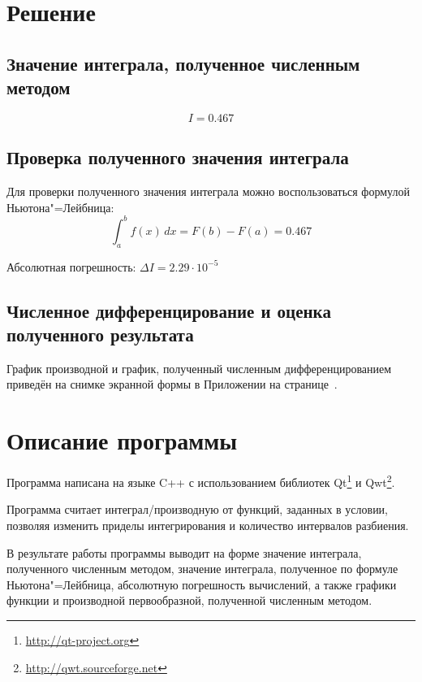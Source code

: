 \documentclass[a4paper,12pt,notitlepage,headsepline,pdftex]{scrartcl}
\begin{document}
\section{Решение}
  \subsection{Значение интеграла, полученное численным методом}
    \begin{equation}
      I = 0.467
      \label{eq:I}
    \end{equation}
  \subsection{Проверка полученного значения интеграла}
    Для проверки полученного значения интеграла можно воспользоваться формулой
    Ньютона"=Лейбница:
    \begin{equation}
      \int_a^b f\left( x \right)\,dx = F\left( b \right) - F\left( a
      \right) = 0.467
      \label{eq:NL}
    \end{equation}

    Абсолютная погрешность: $\Delta I = 2.29\cdot10^{-5}$
  \subsection{Численное дифференцирование и оценка полученного результата}
    График производной и график, полученный численным дифференцированием
    приведён на снимке экранной формы в Приложении на
    странице~\pageref{fig:gui}.

\section{Описание программы}
  Программа написана на языке C++ с использованием библиотек
  Qt\footnote{\url{http://qt-project.org}} и
  Qwt\footnote{\url{http://qwt.sourceforge.net}}.

  Программа считает интеграл/производную от функций, заданных в условии,
  позволяя изменить приделы интегрирования и количество интервалов разбиения.

  В результате работы программы выводит на форме значение интеграла,
  полученного численным методом, значение интеграла, полученное по формуле
  Ньютона"=Лейбница, абсолютную погрешность вычислений, а также графики
  функции и производной первообразной, полученной численным методом.
  \newpage
\end{document}
